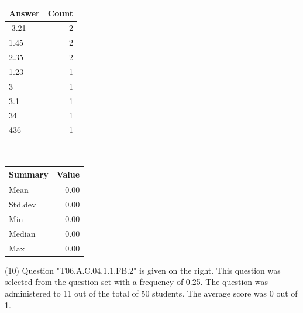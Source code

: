\documentclass[12pt,english,nohyper]{tufte-handout}\usepackage[]{graphicx}\usepackage[]{color}
\begin{document}
\begin{center}%
\begin{tabular}{lr}
  \hline
Answer & Count \\ 
  \hline
-3.21 &   2 \\ 
  1.45 &   2 \\ 
  2.35 &   2 \\ 
  1.23 &   1 \\ 
  3 &   1 \\ 
  3.1 &   1 \\ 
  34 &   1 \\ 
  436 &   1 \\ 
   \hline
\end{tabular}
~~~~~~~~%
\begin{tabular}{lr}
  \hline
Summary & Value \\ 
  \hline
Mean & 0.00 \\ 
  Std.dev & 0.00 \\ 
  Min & 0.00 \\ 
  Median & 0.00 \\ 
  Max & 0.00 \\ 
   \hline
\end{tabular}
\end{center}\newpage{} (10) Question "T06.A.C.04.1.1.FB.2" is given on the right. This question was selected from the question set with a frequency of 0.25. The question was administered to 11 out of the total of 50 students. The average score was 0 out of 1.
\end{document}
